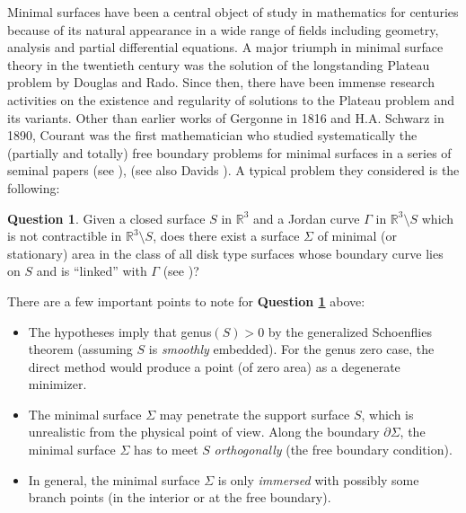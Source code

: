 \documentclass[10pt]{amsart}
\theoremstyle{definition}
\newtheorem{question}{Question}
\theoremstyle{remark}
\numberwithin{equation}{section}
\newcommand{\R}{\mathbb{R}}
\begin{document}
Minimal surfaces have been a central object of study in mathematics for centuries because of its natural appearance in a wide range of fields including geometry, analysis and partial differential equations. A major triumph in minimal surface theory in the twentieth century was the solution of the longstanding Plateau problem by Douglas and Rado. 
Since then, there have been immense research activities on the existence and regularity of solutions to the Plateau problem and its variants. Other than earlier works of Gergonne in 1816 and H.A. Schwarz in 1890, Courant was the first mathematician who studied systematically the (partially and totally) free boundary problems for minimal surfaces in a series of seminal papers (see \cite[Chapter VI]{Courant}), 
(see also Davids \cite{Courant-Davids40}). A typical problem they considered is the following:

\begin{question}
\label{Q1}
Given a closed surface $S$ in $\R^3$ and a Jordan curve $\Gamma$ in $\R^3 \setminus S$ which is not contractible in $\R^3 \setminus S$, does there exist a surface $\Sigma$ of minimal (or stationary) area in the class of all disk type surfaces whose boundary curve lies on $S$ and is ``linked'' with $\Gamma$ (see \cite[p.213-218]{Courant})?
\end{question}

There are a few important points to note for \textbf{Question \ref{Q1}} above:
\begin{itemize}
\item[(1)] The hypotheses imply that genus$(S)>0$ by the generalized Schoenflies theorem (assuming $S$ is \emph{smoothly} embedded). For the genus zero case, the direct method would produce a point (of zero area) as a degenerate minimizer. 
\item[(2)] The minimal surface $\Sigma$ may penetrate the support surface $S$, which is unrealistic from the physical point of view. Along the boundary $\partial \Sigma$, the minimal surface $\Sigma$ has to meet $S$ \emph{orthogonally} (the free boundary condition).
\item[(3)] In general, the minimal surface $\Sigma$ is only \emph{immersed} with possibly some branch points (in the interior or at the free boundary).
\end{itemize}
\end{document}
